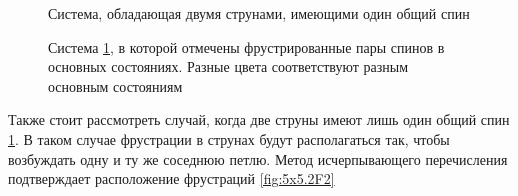 \documentclass[utf8, babel, sor, jor, amsmath, amssymb, reprint]{elsarticle} %
\begin{document}
\begin{figure}[h]
	\centering
	\caption{Система, обладающая двумя струнами, имеющими один общий спин}
	\label{fig:5x5.2F}
\end{figure}
\begin{figure}[h]
	\centering
	\caption{Система \ref{fig:5x5.2F}, в которой отмечены фрустрированные пары спинов в основных состояниях. Разные цвета соответствуют разным основным состояниям}
	\label{fig:5x5.22F}
\end{figure}
Также стоит рассмотреть случай, когда две струны имеют лишь один общий спин \ref{fig:5x5.2F}.
В таком случае фрустрации в струнах будут располагаться так, чтобы возбуждать одну и ту же соседнюю петлю.
Метод исчерпывающего перечисления подтверждает расположение фрустраций \ref{fig:5x5.2F2}
\end{document}
